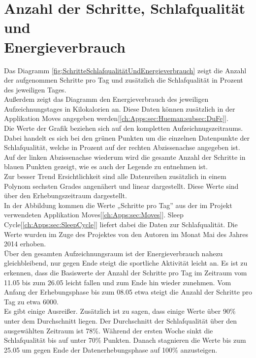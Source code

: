 \section{Anzahl der Schritte, Schlafqualität und\\ Energieverbrauch}
\label{ch:AnalyseUndEvaluierung:sec:SchritteSchlafqualitätUndEnergieverbrauch}


Das Diagramm \ref{fig:SchritteSchlafqualitätUndEnergieverbrauch} zeigt die Anzahl der aufgenommen Schritte pro Tag und zusätzlich die Schlafqualität in Prozent des jeweiligen Tages. \\
Außerdem zeigt das Diagramm den Energieverbrauch des jeweiligen Aufzeichnungstages in Kilokalorien an.
Diese Daten können zusätzlich in der Applikation Moves angegeben werden[\ref{ch:Apps:sec:Hueman:subsec:DuFe}]. \\ 
Die Werte der Grafik beziehen sich auf den kompletten Aufzeichnugszeitraums. 
Dabei handelt es sich bei den grünen Punkten um die einzelnen Datenpunkte der Schlafqualität, welche in Prozent auf der rechten Abzissenachse angegeben ist.
Auf der linken Abzissenachse wiederum wird die gesamte Anzahl der Schritte in blauen Punkten gezeigt, wie es auch der Legende zu entnehmen ist. \\
Zur besser Trend Ersichtlichkeit sind alle Datenreihen zusätzlich in einem Polynom sechsten Grades angenähert und linear dargestellt.
Diese Werte sind über den Erhebungszeitraum dargestellt. \\
In der Abbildung kommen die Werte „Schritte pro Tag” aus der im Projekt verwendeten Applikation Moves[\ref{ch:Apps:sec:Moves}]. 
Sleep Cycle[\ref{ch:Apps:sec:SleepCycle}] liefert dabei die Daten zur Schlafqualität.
Die Werte wurden im Zuge des Projektes von den Autoren im Monat Mai des Jahres 2014 erhoben. \\
Über den gesamten Aufzeichnungsraum ist der Energieverbrauch nahezu gleichbleibend, nur gegen Ende steigt die sportliche Aktivität leicht an.
Es ist zu erkennen, dass die Basiswerte der Anzahl der Schritte pro Tag im Zeitraum vom 11.05 bis zum 26.05 leicht fallen und zum Ende hin wieder zunehmen. 
Vom Anfang der Erhebungsphase bis zum 08.05 etwa steigt die Anzahl der Schritte pro Tag zu etwa 6000. \\
Es gibt einige Ausreißer.
Zusätzlich ist zu sagen, dass einige Werte über 90\% unter dem Durchschnitt liegen.
Der Durchschnitt der Schlafqualität über den ausgewählten Zeitraum ist 78\%.
Während der ersten Woche sinkt die Schlafqualität bis auf unter 70\% Punkten.
Danach stagnieren die Werte bis zum 25.05 um gegen Ende der Datenerhebungsphase auf 100\% anzusteigen.


